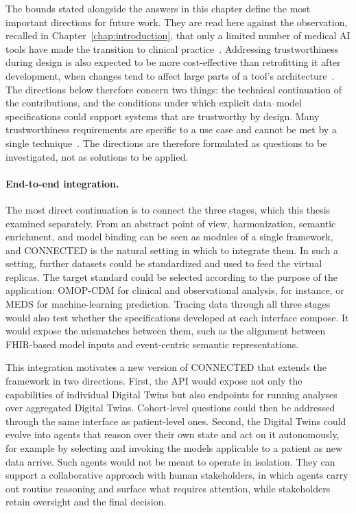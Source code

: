 The bounds stated alongside the answers in this chapter define the most important directions for future work. They are read here against the observation, recalled in Chapter~\ref{chap:introduction}, that only a limited number of medical AI tools have made the transition to clinical practice~\cite{lekadir_future-ai_2025}. Addressing trustworthiness during design is also expected to be more cost-effective than retrofitting it after development, when changes tend to affect large parts of a tool's architecture~\cite{lekadir_future-ai_2025}. The directions below therefore concern two things: the technical continuation of the contributions, and the conditions under which explicit data--model specifications could support systems that are trustworthy by design. Many trustworthiness requirements are specific to a use case and cannot be met by a single technique~\cite{lekadir_future-ai_2025}. The directions are therefore formulated as questions to be investigated, not as solutions to be applied.

\paragraph{End-to-end integration.}
The most direct continuation is to connect the three stages, which this thesis examined separately. From an abstract point of view, harmonization, semantic enrichment, and model binding can be seen as modules of a single framework, and CONNECTED is the natural setting in which to integrate them. In such a setting, further datasets could be standardized and used to feed the virtual replicas. The target standard could be selected according to the purpose of the application: OMOP-CDM for clinical and observational analysis, for instance, or MEDS for machine-learning prediction. Tracing data through all three stages would also test whether the specifications developed at each interface compose. It would expose the mismatches between them, such as the alignment between FHIR-based model inputs and event-centric semantic representations.

This integration motivates a new version of CONNECTED that extends the framework in two directions. First, the API would expose not only the capabilities of individual Digital Twins but also endpoints for running analyses over aggregated Digital Twins. Cohort-level questions could then be addressed through the same interface as patient-level ones. Second, the Digital Twins could evolve into agents that reason over their own state and act on it autonomously, for example by selecting and invoking the models applicable to a patient as new data arrive. Such agents would not be meant to operate in isolation. They can support a collaborative approach with human stakeholders, in which agents carry out routine reasoning and surface what requires attention, while stakeholders retain oversight and the final decision.

